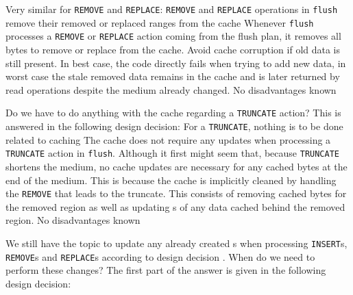 Very similar for \texttt{REMOVE} and \texttt{REPLACE}:
{%
\texttt{REMOVE} and \texttt{REPLACE} operations in \texttt{flush} remove their removed or replaced ranges from the cache
}
{%
Whenever \texttt{flush} processes a \texttt{REMOVE} or \texttt{REPLACE} action coming from the flush plan, it removes all bytes to remove or replace from the cache.
}
{%
Avoid cache corruption if old data is still present. In best case, the code directly fails when trying to add new data, in worst case the stale removed data remains in the cache and is later returned by read operations despite the medium already changed.
}
{%
No disadvantages known
}

Do we have to do anything with the cache regarding a \texttt{TRUNCATE} action? This is answered in the following design decision:
{%
For a \texttt{TRUNCATE}, nothing is to be done related to caching
}
{%
The cache does not require any updates when processing a \texttt{TRUNCATE} action in \texttt{flush}.
}
{%
Although it first might seem that, because \texttt{TRUNCATE} shortens the medium, no cache updates are necessary for any cached bytes at the end of the medium. This is because the cache is implicitly cleaned by handling the \texttt{REMOVE} that leads to the truncate. This consists of removing cached bytes for the removed region as well as updating \IMediumReference{}s of any data cached behind the removed region.
}
{%
No disadvantages known
}

We still have the topic to update any already created \IMediumReference{}s when processing \texttt{INSERT}s, \texttt{REMOVE}s and \texttt{REPLACE}s according to design decision . When do we need to perform these changes? The first part of the answer is given in the following design decision:

